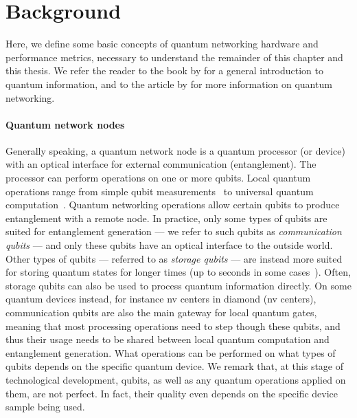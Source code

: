 \section{Background}
\label{sec:background:background}

Here, we define some basic concepts of quantum networking hardware and performance metrics,
necessary to understand the remainder of this chapter and this thesis. We refer the reader to the
book  by \textcite{nielsen_chuang_2002} for a general introduction to
quantum information, and to the article  by
\textcite{dahlberg_2019_egp} for more information on quantum networking.

\paragraph{Quantum network nodes}

Generally speaking, a quantum network node is a quantum processor (or device) with an optical
interface for external communication (entanglement). The processor can perform operations on one or
more qubits. Local quantum operations range from simple qubit
measurements~\cite{vallone_2015_satellite, yin_2017_satellite} to universal quantum
computation~\cite{bernien_2013_heralded, humphreys_2018_delivery, pompili_2021_multinode,
moehring_2007_ion_traps, reiserer_2015_neutral_atoms}. Quantum networking operations allow certain
qubits to produce entanglement with a remote node. In practice, only some types of qubits are suited
for entanglement generation --- we refer to such qubits as \emph{communication qubits} --- and only
these qubits have an optical interface to the outside world. Other types of qubits --- referred to
as \emph{storage qubits} --- are instead more suited for storing quantum states for longer times (up
to seconds in some cases~\cite{abobeih_2018_one_sec, bradley_2019_one_min}). Often, storage qubits
can also be used to process quantum information directly. On some quantum devices instead, for
instance \acrlong{nv} centers in diamond (\acrshort{nv} centers), communication qubits are also the
main gateway for local quantum gates, meaning that most processing operations need to step though
these qubits, and thus their usage needs to be shared between local quantum computation and
entanglement generation. What operations can be performed on what types of qubits depends on the
specific quantum device. We remark that, at this stage of technological development, qubits, as well
as any quantum operations applied on them, are not perfect. In fact, their quality even depends on
the specific device sample being used.

